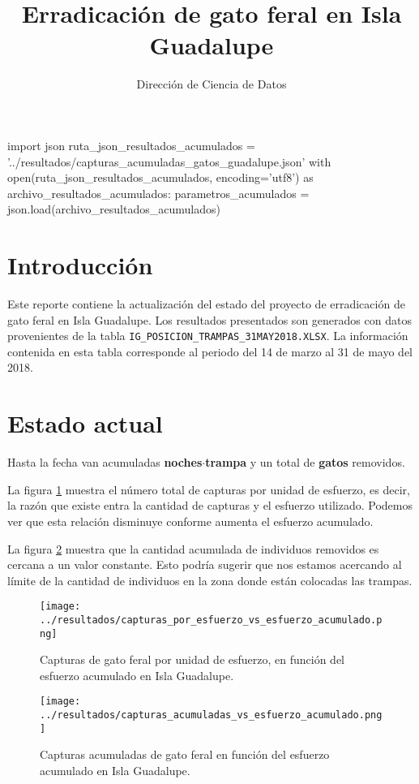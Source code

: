 \documentclass{article}
\title{Erradicaci\'on de gato feral en Isla Guadalupe}
\author{Direcci\'on de Ciencia de Datos}
\begin{document}
    
\maketitle

\begin{pycode}
import json
ruta_json_resultados_acumulados = '../resultados/capturas_acumuladas_gatos_guadalupe.json'
with open(ruta_json_resultados_acumulados, encoding='utf8') as archivo_resultados_acumulados: parametros_acumulados = json.load(archivo_resultados_acumulados)
\end{pycode}

\section*{Introducci\'on}
Este reporte contiene la actualización del estado del proyecto de erradicación de gato feral en Isla Guadalupe. Los resultados 
presentados son generados con datos provenientes de la tabla \texttt{IG\_POSICION\_TRAMPAS\_31MAY2018.XLSX}. La información contenida 
en esta tabla corresponde al periodo del 14 de marzo al 31 de mayo del 2018.

\section*{Estado actual}

Hasta la fecha van acumuladas \textbf{ noches$\cdot$trampa} y un total de \textbf{ gatos} removidos. 

La figura \ref{fig:capturas_por_esfuerzo} muestra el número total de capturas por unidad de esfuerzo, es decir, la razón que existe 
entra la cantidad de capturas y el esfuerzo utilizado. Podemos ver que esta relación disminuye conforme aumenta el esfuerzo acumulado.

La figura \ref{fig:capturas_acumuladas} muestra que la cantidad acumulada de individuos removidos es cercana a un valor constante. Esto 
podría sugerir que nos estamos acercando al límite de la cantidad de individuos en la zona donde están colocadas las trampas.

\begin{figure}[h]
    \centering
    \texttt{[image: ../resultados/capturas\_por\_esfuerzo\_vs\_esfuerzo\_acumulado.png]}
    \caption{Capturas de gato feral por unidad de esfuerzo, en función del esfuerzo acumulado en Isla Guadalupe.}
    \label{fig:capturas_por_esfuerzo}
\end{figure}

\begin{figure}[h]
    \centering
    \texttt{[image: ../resultados/capturas\_acumuladas\_vs\_esfuerzo\_acumulado.png]}
    \caption{Capturas acumuladas de gato feral en función del esfuerzo acumulado en Isla Guadalupe.}
    \label{fig:capturas_acumuladas}
\end{figure}
\end{document}
